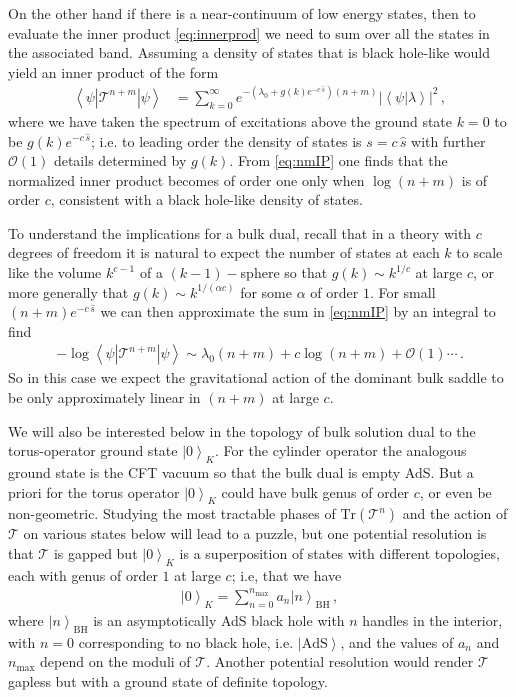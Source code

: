\documentclass[letterpaper,12pt]{article}
\newcommand{\ban}[1]{\begin{align}#1\end{align}}
\newcommand{\corr}[1]{\left< #1\right>}
\newcommand{\Tr}{\text{Tr}}
\newcommand{\ket}[1]{\left| #1\right>}
\begin{document}
On the other hand if there is a near-continuum of low energy states, then to evaluate the inner product \eqref{eq:innerprod} we need to sum over all the states in the associated band. Assuming a density of states that is black hole-like would yield an inner product of the form
\ban{
\label{eq:nmIP}
\corr {\psi| \mathcal T^{n+m} |\psi} &= \sum_{k=0}^\infty e^{-( \lambda_0 + g(k)e^{-c\, \hat s} )(n+m)} |\corr{\psi|\lambda}|^2\, ,
}
where we have taken the spectrum of excitations above the ground state $k=0$ to be $g(k) e^{-c\, \hat s}$; i.e. to leading order the density of states is $s= c \, \hat s$ with further $\mathcal O(1)$ details determined by $g(k)$.   From \eqref{eq:nmIP} one finds that the normalized inner product becomes of order one only when $\log(n+m)$ is of order $c$, consistent with a black hole-like density of states.  

To understand the implications for a bulk dual, recall that in a theory with $c$ degrees of freedom it is natural to expect the number of states at each $k$ to scale like the volume $k^{c-1}$ of a $(k-1)-$sphere so that $g(k)\sim k^{1/c}$ at large $c$, or more generally that $g(k)\sim k^{1/(\alpha c)}$ for some $\alpha$ of order $1$. For small $(n+m)e^{-c \,\hat s}$ we can then approximate the sum in \eqref{eq:nmIP} by an integral to find
\ban{
-\log {\corr {\psi| \mathcal T^{n+m} |\psi} }\sim    \lambda_0(n+m) + c \log(n+m) + \mathcal O(1) \cdots  \, .
}
So in this case we expect the gravitational action of the dominant bulk saddle to  be only approximately linear in $(n+m)$ at large $c$.

We will also be interested below in the topology of bulk solution dual to the torus-operator ground state $\ket 0_K$. For the cylinder operator the analogous ground state is the CFT vacuum so that the bulk dual is empty AdS.  But a priori for the torus operator $\ket 0_K$ could have bulk genus of order $c$, or even be non-geometric.   Studying the most tractable phases of $\Tr(\mathcal T^n)$ and the action of $\mathcal T$ on various states below will lead to a puzzle, but one potential resolution is that $\mathcal T$ is gapped but $\ket 0_K$ is a superposition of states with different topologies, each with genus of order $1$ at large $c$; i.e, that we have
\ban{
\ket 0_K = \sum_{n=0}^{n_\text{max}} a_n \ket {n}_\text{BH}\, ,\label{eq:gs}
}
where $\ket{n}_\text{BH}$ is an asymptotically AdS black hole with $n$ handles in the interior, with $n=0$ corresponding to no black hole, i.e. $\ket{\text{AdS}}$, and the values of $a_n$ and $n_\text{max}$ depend on the moduli of $\mathcal T$. Another potential resolution would render $\mathcal T$ gapless but with a ground state of definite topology.
\end{document}
